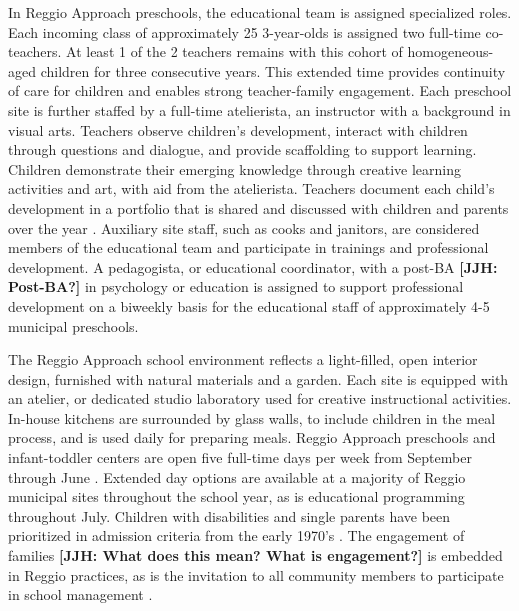 In Reggio Approach preschools, the educational team is assigned specialized roles. Each incoming class of approximately 25 3-year-olds is assigned two full-time co-teachers. At least 1 of the 2 teachers remains with this cohort of homogeneous-aged children for three consecutive years. This extended time provides continuity of care for children and enables strong teacher-family engagement. Each preschool site is further staffed by a full-time atelierista, an instructor with a background in visual arts. Teachers observe children's development, interact with children through questions and dialogue, and provide scaffolding to support learning. Children demonstrate their emerging knowledge through creative learning activities and art, with aid from the atelierista. Teachers document each child's development in a portfolio that is shared and discussed with children and parents over the year \citep{Rinaldi_2006_ReggioEmilia_BOOK,Giudici-Nicolosi_2014_Reggio-Approach}. Auxiliary site staff, such as cooks and janitors, are considered members of the educational team and participate in trainings and professional development. A pedagogista, or educational coordinator, with a post-BA \textbf{[JJH: Post-BA?]} in psychology or education is assigned to support professional development on a biweekly basis for the educational staff of approximately 4-5 municipal preschools.

The Reggio Approach school environment reflects a light-filled, open interior design, furnished with natural materials and a garden. Each site is equipped with an atelier, or dedicated studio laboratory used for creative instructional activities. In-house kitchens are surrounded by glass walls, to include children in the meal process, and is used daily for preparing meals. Reggio Approach preschools and infant-toddler centers are open five full-time days per week from September through June \citep{Giudici-Nicolosi_2014_Reggio-Approach}. Extended day options are available at a majority of Reggio municipal sites throughout the school year, as is educational programming throughout July. Children with disabilities and single parents have been prioritized in admission criteria from the early 1970's \citep{Edwards-etal-eds_1998_Hundred-Languages}. The engagement of families \textbf{[JJH: What does this mean? What is engagement?]} is embedded in Reggio practices, as is the invitation to all community members to participate in school management \citep{CEHD_2016_Historical-Analysis,Cagliari-etal-eds_2016_BOOK_Loris-Malaguzzi}.

